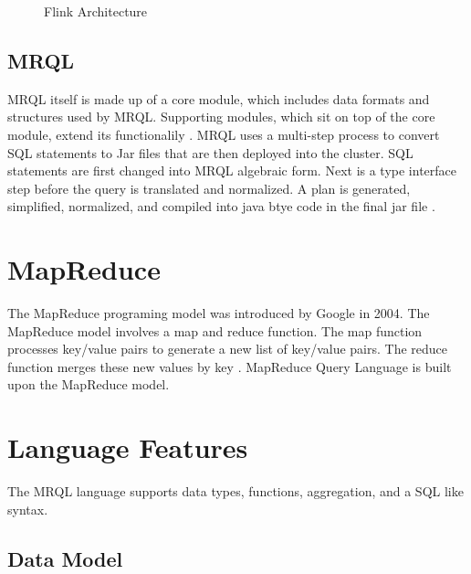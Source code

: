 \documentclass[9pt,twocolumn,twoside]{../../styles/osajnl}
\begin{document}

\begin{figure}[htbp]
\centering
{}
\caption{Flink Architecture \cite{www-flinkarch}}
\label{fig:flink-arch}
\end{figure}


\subsection{MRQL}

MRQL itself is made up of a core module, which includes data formats and structures used by MRQL.  Supporting modules, which sit on top of the core module, extend its functionalily \cite{mrqlthesis}.  MRQL uses a multi-step process to convert SQL statements to Jar files that are then deployed into the cluster.  SQL statements are first changed into MRQL algebraic form.  Next is a type interface step before the query is translated and normalized.  A plan is generated, simplified, normalized, and compiled into java btye code in the final jar file \cite{mrqlthesis}.


\section{MapReduce}

The MapReduce programing model was introduced by Google in 2004.  The MapReduce model involves a map and reduce function.  The map function processes key/value pairs to generate a new list of key/value pairs.  The reduce function merges these new values by key \cite{googlemapreduce}.  MapReduce Query Language is built upon the MapReduce model.  


\section{Language Features}

The MRQL language supports data types, functions, aggregation, and a SQL like syntax.

\subsection{Data Model}
\end{document}

